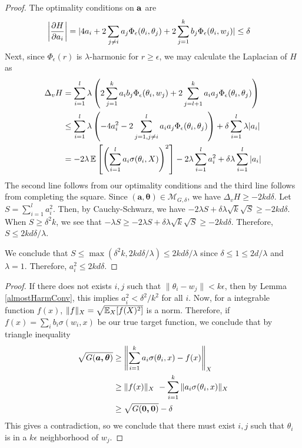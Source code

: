 \begin{proof}
The optimality conditions on ${\bf a}$ are 
\begin{align*}
   \left| \frac{\partial H}{\partial a_i} \right| & = \lvert 4a_i  + 2\sum_{j\neq i} a_j \Phi_\epsilon(\theta_i,\theta_j) + 2\sum_{j=1}^k b_j \Phi_\epsilon(\theta_i,w_j) \rvert \leq \delta
\end{align*}
%
Next, since $\Phi_\epsilon(r)$ is $\lambda$-harmonic for $r \geq \epsilon$, we may calculate the Laplacian of $H$ as
%
\begin{align*}
\Delta_v H & = \sum_{i=1}^l \lambda \left(2\sum_{j=1}^k a_ib_j
  \Phi_\epsilon(\theta_i, w_j) + 2\sum_{j=l+1}^k a_ia_j
  \Phi_\epsilon(\theta_i, \theta_j)\right) \\
& \leq \sum_{i=1}^l \lambda \left(-4 a_i^2 - 2
  \sum_{j = 1, j\neq i}^l  a_ia_j \Phi_\epsilon(\theta_i,\theta_j)\right)+ \delta \sum_{i=1}^l \lambda |a_i| \\
&= -2\lambda\operatorname*{\mathbb{E}}\left[\left( \sum_{i=1}^l a_i \sigma(\theta_i,X)\right)^2\right] -2\lambda \sum_{i=1}^l a_i^2+ \delta\lambda\sum_{i=1}^l  |a_i| 
\end{align*} 
%
The second line follows from our optimality conditions and the third line follows from completing the square. Since $\boldsymbol{(a,\theta)} \in \mathcal{M}_{G,\delta}$, we have $\Delta_v H \geq - 2kd\delta$. Let $S = \sum_{i=1}^l a_i^2$. Then, by Cauchy-Schwarz, we have $-2 \lambda S + \delta\lambda\sqrt{k} \sqrt{S} \geq -2kd\delta$. When $S \geq \delta^2 k$, we see that $-\lambda S \geq -2 \lambda S + \delta\lambda \sqrt{k}\sqrt{S} \geq -2kd\delta$. Therefore, $S \leq 2kd\delta/\lambda$.
 
We conclude that $S \leq \max(\delta^2k, 2kd\delta/\lambda) \leq 2kd\delta/\lambda$ since $\delta\leq 1 \leq 2d/\lambda$ and $\lambda = 1$. Therefore, $a_i^2 \leq 2kd\delta$.
\end{proof}

\AlmostHarmRes*

 \begin{proof}
 If there does not exists $i, j$ such that
   $\|\theta_i - w_j\| <k\epsilon$, then by Lemma \ref{almostHarmConv}, this implies $a_i^2 < \delta^2/k^2$ for all $i$. Now, for a integrable
   function $f(x)$, $\| f\|_X = \sqrt{\operatorname*{\mathbb{E}}_X[f(X)^2]}$ is a
   norm. Therefore, if $f(x) = \sum_i b_i \sigma(w_i,x)$ be our true
   target function, we conclude that by triangle inequality
\begin{align*}
\sqrt{G(\boldsymbol{a,\theta})}  & \geq \left\lVert \sum_{i=1}^k a_i \sigma(\theta_i,x) - f(x) \right\rVert_X \\
&\geq \|f(x)\|_X\ - \sum_{i=1}^k \|a_i\sigma(\theta_i,x) \|_X \\
& \geq
  \sqrt{G(\boldsymbol{0,0})} - \delta
\end{align*}
This gives a contradiction, so we conclude that there must exist $i, j$ such that $\theta_i$ is in a $k\epsilon$ neighborhood of $w_j$.
 \end{proof}
 
